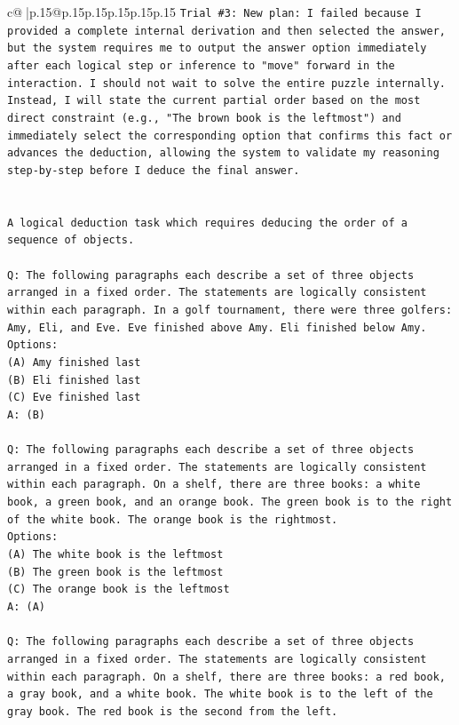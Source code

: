 \documentclass{article}
\begin{document}
{\begin{supertabular}{c@{$\;$}|p{.15\linewidth}@{}p{.15\linewidth}p{.15\linewidth}p{.15\linewidth}p{.15\linewidth}p{.15\linewidth}}
{{{\texttt{Trial \#3: New plan: I failed because I provided a complete internal derivation and then selected the answer, but the system requires me to output the answer option immediately after each logical step or inference to "move" forward in the interaction. I should not wait to solve the entire puzzle internally. Instead, I will state the current partial order based on the most direct constraint (e.g., "The brown book is the leftmost") and immediately select the corresponding option that confirms this fact or advances the deduction, allowing the system to validate my reasoning step{-}by{-}step before I deduce the final answer.} \\
\\ 
\\ 
\texttt{A logical deduction task which requires deducing the order of a sequence of objects.} \\
\\ 
\texttt{Q: The following paragraphs each describe a set of three objects arranged in a fixed order. The statements are logically consistent within each paragraph. In a golf tournament, there were three golfers: Amy, Eli, and Eve. Eve finished above Amy. Eli finished below Amy.} \\
\texttt{Options:} \\
\texttt{(A) Amy finished last} \\
\texttt{(B) Eli finished last} \\
\texttt{(C) Eve finished last} \\
\texttt{A: (B)} \\
\\ 
\texttt{Q: The following paragraphs each describe a set of three objects arranged in a fixed order. The statements are logically consistent within each paragraph. On a shelf, there are three books: a white book, a green book, and an orange book. The green book is to the right of the white book. The orange book is the rightmost.} \\
\texttt{Options:} \\
\texttt{(A) The white book is the leftmost} \\
\texttt{(B) The green book is the leftmost} \\
\texttt{(C) The orange book is the leftmost} \\
\texttt{A: (A)} \\
\\ 
\texttt{Q: The following paragraphs each describe a set of three objects arranged in a fixed order. The statements are logically consistent within each paragraph. On a shelf, there are three books: a red book, a gray book, and a white book. The white book is to the left of the gray book. The red book is the second from the left.} \\
}}}
\end{supertabular}}
\end{document}
